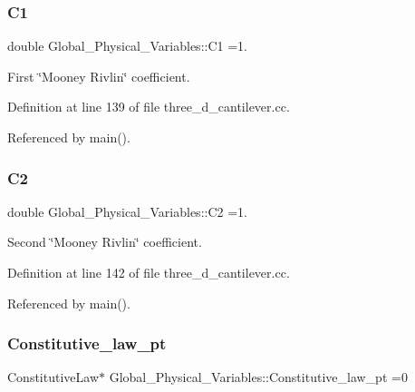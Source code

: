 \subsubsection{\texorpdfstring{C1}{C1}}
{\footnotesize\ttfamily double Global\+\_\+\+Physical\+\_\+\+Variables\+::\+C1 =1.}



First \char`\"{}\+Mooney Rivlin\char`\"{} coefficient. 



Definition at line 139 of file three\+\_\+d\+\_\+cantilever.\+cc.



Referenced by main().

\mbox{\label{namespaceGlobal__Physical__Variables_af9defd1b5745cce50d2c386b3ac0e0ae}} 
\subsubsection{\texorpdfstring{C2}{C2}}
{\footnotesize\ttfamily double Global\+\_\+\+Physical\+\_\+\+Variables\+::\+C2 =1.}



Second \char`\"{}\+Mooney Rivlin\char`\"{} coefficient. 



Definition at line 142 of file three\+\_\+d\+\_\+cantilever.\+cc.



Referenced by main().

\mbox{\label{namespaceGlobal__Physical__Variables_a2a37fb040c832ee7a086bb13bb02a100}} 
\subsubsection{\texorpdfstring{Constitutive\+\_\+law\+\_\+pt}{Constitutive\_law\_pt}}
{\footnotesize\ttfamily Constitutive\+Law$\ast$ Global\+\_\+\+Physical\+\_\+\+Variables\+::\+Constitutive\+\_\+law\+\_\+pt =0}



